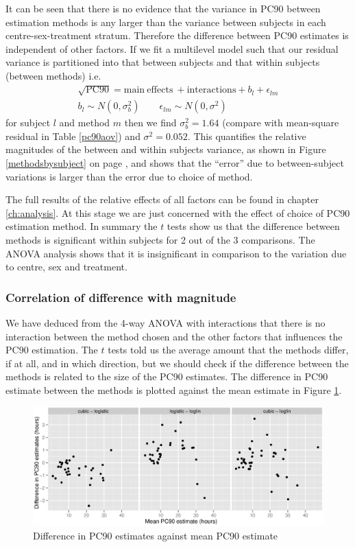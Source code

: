 It can be seen that there is no evidence that the variance in PC90 between estimation methods is any larger than the variance between subjects in each centre-sex-treatment stratum. Therefore the difference between PC90 estimates is independent of other factors. If we fit a multilevel model such that our residual variance is partitioned into that between subjects and that within subjects (between methods) i.e.
\begin{eqnarray*}
\sqrt{\mathrm{PC}90}=\mathrm{main\ effects\ + interactions} + b_{l} + \epsilon_{lm}\\
b_{l}\sim N(0,\sigma_{b}^{2})\quad\quad\epsilon_{lm}\sim N(0,\sigma^{2})\label{methods.lme}
\end{eqnarray*}
for subject $l$ and method $m$ then we find $\sigma_{b}^{2}=1.64$ (compare with mean-square residual in Table \ref{pc90aov}) and $\sigma^{2}=0.052$. This quantifies the relative magnitudes of the between and within subjects variance, as shown in Figure \ref{methodsbysubject} on page \pageref{methodsbysubject}, and shows that the ``error'' due to between-subject variations is larger than the error due to choice of method.

The full results of the relative effects of all factors can be found in chapter \ref{ch:analysis}. At this stage we are just concerned with the effect of choice of PC90 estimation method. In summary the $t$ tests show us that the difference between methods is significant within subjects for 2 out of the 3 comparisons. The ANOVA analysis shows that it is insignificant in comparison to the variation due to centre, sex and treatment.
\subsubsection*{Correlation of difference with magnitude}
We have deduced from the 4-way ANOVA with interactions that there is no interaction between the method chosen and the other factors that influences the PC90 estimation. The $t$ tests told us the average amount that the methods differ, if at all, and in which direction, but we should check if the difference between the methods is related to the size of the PC90 estimates. The difference in PC90 estimate between the methods is plotted against the mean estimate in Figure \ref{pc90est-cor}.
\begin{figure}[h]
\includegraphics[width=150mm]{pc90est-cor.eps} 
\caption{Difference in PC90 estimates against mean PC90 estimate}
\label{pc90est-cor}
\end{figure}

